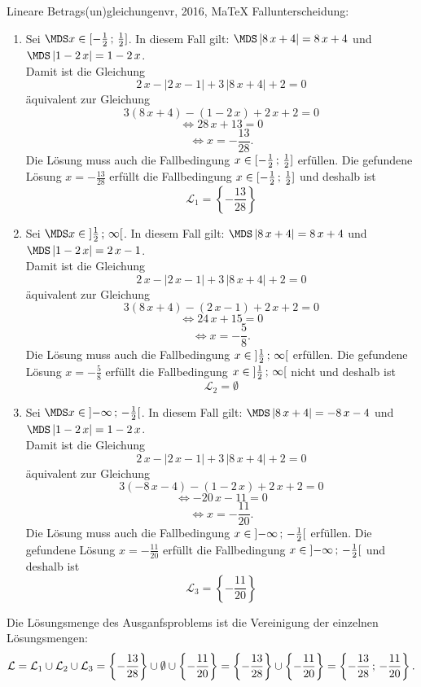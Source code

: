 \begin{MAufgabe}{Lineare Betrags(un)gleichungen}{vr, 2016, MaTeX}
 Fallunterscheidung: 

 \begin{enumerate} 
 \item Sei $ \MDS x\in[ - \frac{1}{2} \, \MIntvlSep \, \frac{1}{2}]$. 
 In diesem Fall gilt: 
  $ \MDS \left| 8\, x + 4\right|=8\, x + 4$ und $ \MDS \left| 1 - 2\, x\right|=1 - 2\, x$. \\ 
 Damit ist die Gleichung 
 $$ 
2\, x - \left|2\, x - 1\right| + 3\, \left|8\, x + 4\right| + 2= 0
$$
 \"aquivalent zur Gleichung
 $$ 
3\left(8\, x + 4\right)-\left( 1 - 2\, x\right)+2\, x+2= 0 
$$  
$$ 
 \Leftrightarrow 28\, x + 13= 0 
$$  
$$ \Leftrightarrow x = - \frac{13}{28} . 
 $$ 
 Die L\"osung muss auch die Fallbedingung $x\in [ - \frac{1}{2} \, ; \, \frac{1}{2}] $ erf\"ullen. Die gefundene L\"osung $x=- \frac{13}{28}$ erf\"ullt die Fallbedingung  $x\in [ - \frac{1}{2} \, ; \, \frac{1}{2}]$ und deshalb ist  $$
 \mathcal{L}_{1}=\left\{- \frac{13}{28}\right\}
 $$ 
\item Sei $ \MDS x\in\MoIl  \frac{1}{2} \, \MIntvlSep \, \infty\MoIr $. 
 In diesem Fall gilt: 
  $ \MDS \left| 8\, x + 4\right|=8\, x + 4$ und $ \MDS \left| 1 - 2\, x\right|=2\, x - 1$. \\ 
 Damit ist die Gleichung 
 $$ 
2\, x - \left|2\, x - 1\right| + 3\, \left|8\, x + 4\right| + 2= 0
$$
 \"aquivalent zur Gleichung
 $$ 
3\left(8\, x + 4\right)-\left( 2\, x - 1\right)+2\, x+2= 0 
$$  
$$ 
 \Leftrightarrow 24\, x + 15= 0 
$$  
$$ \Leftrightarrow x = - \frac{5}{8} . 
 $$ 
 Die L\"osung muss auch die Fallbedingung $x\in \mbox{}]\mathopen{}  \frac{1}{2} \, ; \, \infty[\mbox{}  $ erf\"ullen. Die gefundene L\"osung $x=- \frac{5}{8}$ erf\"ullt die Fallbedingung  $x\in \mbox{}]\mathopen{}  \frac{1}{2} \, ; \, \infty[\mbox{} $ nicht und deshalb ist  $$
 \mathcal{L}_{2}=\emptyset 
 $$ 
\item Sei $ \MDS x\in\MoIl  -\infty \, \MIntvlSep \, - \frac{1}{2}\MoIr $. 
 In diesem Fall gilt: 
  $ \MDS \left| 8\, x + 4\right|= - 8\, x - 4$ und $ \MDS \left| 1 - 2\, x\right|=1 - 2\, x$. \\ 
 Damit ist die Gleichung 
 $$ 
2\, x - \left|2\, x - 1\right| + 3\, \left|8\, x + 4\right| + 2= 0
$$
 \"aquivalent zur Gleichung
 $$ 
3\left( - 8\, x - 4\right)-\left( 1 - 2\, x\right)+2\, x+2= 0 
$$  
$$ 
 \Leftrightarrow  - 20\, x - 11= 0 
$$  
$$ \Leftrightarrow x = - \frac{11}{20} . 
 $$ 
 Die L\"osung muss auch die Fallbedingung $x\in \mbox{}]\mathopen{}  -\infty \, ; \, - \frac{1}{2}[\mbox{}  $ erf\"ullen. Die gefundene L\"osung $x=- \frac{11}{20}$ erf\"ullt die Fallbedingung  $x\in \mbox{}]\mathopen{}  -\infty \, ; \, - \frac{1}{2}[\mbox{} $ und deshalb ist  $$
 \mathcal{L}_{3}=\left\{- \frac{11}{20}\right\}
 $$ 
 \end{enumerate} 
  Die L\"osungsmenge des Ausganfsproblems ist die Vereinigung der einzelnen L\"osungsmengen: 
$$ \mathcal{L} = \mathcal{L}_{1} \cup \mathcal{L}_{2} \cup \mathcal{L}_{3} 
 = \left\{- \frac{13}{28}\right\}\cup \emptyset\cup \left\{- \frac{11}{20}\right\} 
  =\left\{- \frac{13}{28}\right\}\cup\left\{- \frac{11}{20}\right\} 
  = \left\{- \frac{13}{28}\, ; \,- \frac{11}{20}\right\} 
 . $$ 
 

\end{MAufgabe}
